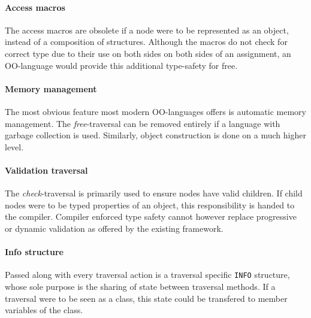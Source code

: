 \documentclass[twoside,openright]{uva-bachelor-thesis}
\newcommand{\code}[1]{\texttt{\footnotesize#1}}
\begin{document}
		\paragraph{Access macros}
			The access macros are obsolete if a node were to be represented as an object, instead of a composition of structures. Although the macros do not check for correct type due to their use on both sides on both sides of an assignment, an OO-language would provide this additional type-safety for free.
			
		\paragraph{Memory management}
			The most obvious feature most modern OO-languages offers is automatic memory management. The \emph{free}-traversal can be removed entirely if a language with garbage collection is used. Similarly, object construction is done on a much higher level.
			
		\paragraph{Validation traversal}
			The \emph{check}-traversal is primarily used to ensure nodes have valid children. If child nodes were to be typed properties of an object, this responsibility is handed to the compiler. Compiler enforced type safety cannot however replace progressive or dynamic validation as offered by the existing framework.
			
		\paragraph{Info structure}
			Passed along with every traversal action is a traversal specific \code{INFO} structure, whose sole purpose is the sharing of state between traversal methods. If a traversal were to be seen as a class, this state could be transfered to member variables of the class.
	
\end{document}
